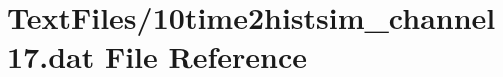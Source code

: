 \hypertarget{10time2histsim__channel17_8dat}{}\section{Text\+Files/10time2histsim\+\_\+channel17.dat File Reference}
\label{10time2histsim__channel17_8dat}
